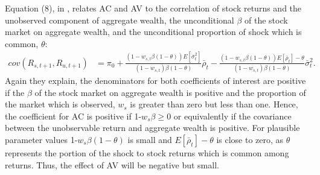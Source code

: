 Equation (8), in \cite{pollet_average_2010}, relates AC and AV to the correlation of stock returns and the unobserved component of aggregate wealth, the unconditional $\beta$ of the stock market on aggregate wealth, and the unconditional proportion of shock which is common, $\theta$: 
\begin{align*}
cov(R_{s,t+1},R_{u,t+1}) &= \pi_{0} + \frac{(1-w_{s,t}\beta(1-\theta))E[\bar{\sigma}^{2}_{t}]}{(1-w_{s,t})\beta(1-\theta)}\bar{\rho}_{t}- \frac{(1-w_{s,t}\beta(1-\theta))E[\bar{\rho}_{t}]-\theta}{(1-w_{s,t})\beta(1-\theta)}\bar{\sigma}^{2}_{t}.
\end{align*}
Again they explain, the denominators for both coefficients of interest are positive if the $\beta$ of the stock market on aggregate wealth is positive and the proportion of the market which is observed, $w_{s}$ is greater than zero but less than one. Hence, the coefficient for AC is positive if 1-$w_{s}\beta \geq 0$ or equivalently if the covariance between the unobservable return and aggregate wealth is positive. For plausible parameter values 1-$w_{s}\beta(1-\theta)$ is small and $E[\bar{\rho}_{t}]-\theta$ is close to zero, as $\theta$ represents the portion of the shock to stock returns which is common among returns. Thus, the effect of AV will be negative but small. 

